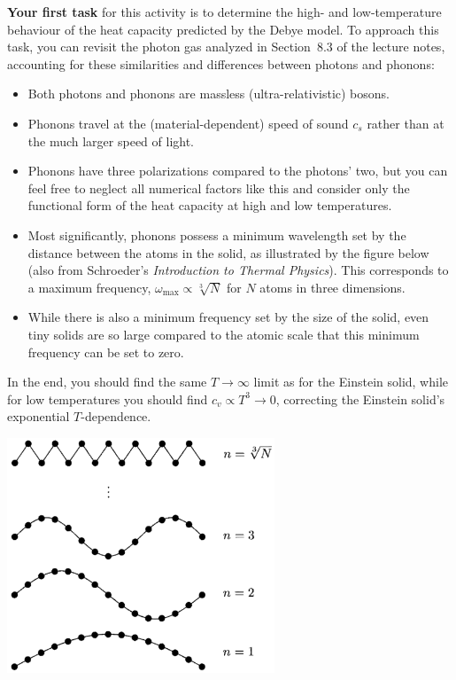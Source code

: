 \documentclass[12 pt]{article} %
\newcommand{\om}{\ensuremath{\omega} }
\begin{document}
\textbf{Your first task} for this activity is to determine the high- and low-temperature behaviour of the heat capacity predicted by the Debye model.
To approach this task, you can revisit the photon gas analyzed in Section~8.3 of the lecture notes, accounting for these similarities and differences between photons and phonons: \\[-24 pt]
\begin{itemize}
  \item Both photons and phonons are massless (ultra-relativistic) bosons.
  \item Phonons travel at the (material-dependent) speed of sound $c_s$ rather than at the much larger speed of light.
  \item Phonons have three polarizations compared to the photons' two, but you can feel free to neglect all numerical factors like this and consider only the functional form of the heat capacity at high and low temperatures.
  \item Most significantly, phonons possess a minimum wavelength set by the distance between the atoms in the solid, as illustrated by the figure below (also from Schroeder's \textit{Introduction to Thermal Physics}).
        This corresponds to a maximum frequency, $\om_{\text{max}} \propto \sqrt[3]{N}$ for $N$ atoms in three dimensions.
  \item While there is also a minimum frequency set by the size of the solid, even tiny solids are so large compared to the atomic scale that this minimum frequency can be set to zero.
\end{itemize}
In the end, you should find the same $T \to \infty$ limit as for the Einstein solid, while for low temperatures you should find $c_v \propto T^3 \to 0$, correcting the Einstein solid's exponential $T$-dependence.

\begin{center}\includegraphics[width=0.6\textwidth]{figs/Debye.pdf}\end{center}
\end{document}
